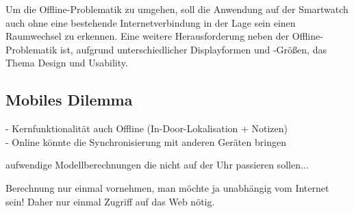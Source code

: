 Um die Offline-Problematik zu umgehen, soll die Anwendung auf der Smartwatch auch ohne eine bestehende Internetverbindung in der Lage sein einen Raumwechsel zu erkennen. Eine weitere Herausforderung neben der Offline-Problematik ist, aufgrund unterschiedlicher Displayformen und -Größen, das Thema Design und Usability.

\subsection{Mobiles Dilemma}
- Kernfunktionalität auch Offline (In-Door-Lokalisation + Notizen)
\\- Online könnte die Synchronisierung mit anderen Geräten bringen


aufwendige Modellberechnungen die nicht auf der Uhr passieren sollen...

Berechnung nur einmal vornehmen, man möchte ja unabhängig vom Internet sein! Daher nur einmal Zugriff auf das Web nötig.
